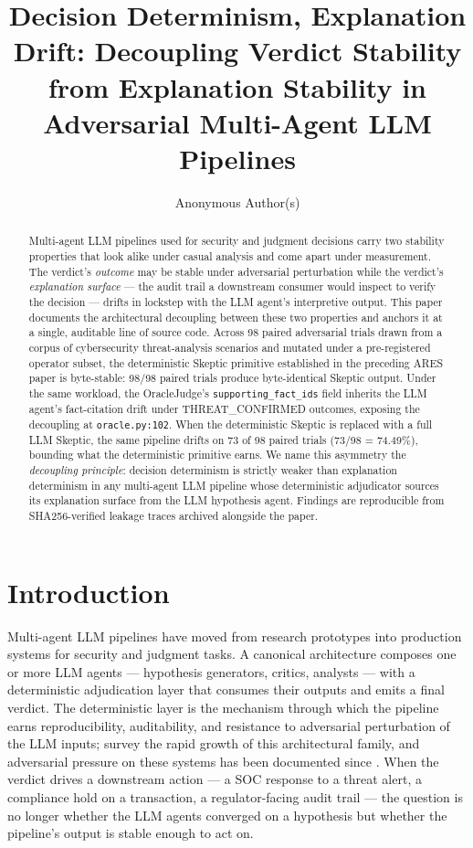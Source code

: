 \documentclass[sigconf,anonymous,review,nonacm=false]{acmart}
\title{Decision Determinism, Explanation Drift: Decoupling Verdict Stability from Explanation Stability in Adversarial Multi-Agent LLM Pipelines}
\author{Anonymous Author(s)}
\affiliation{%
  \institution{Submission under double-blind review}
  \country{}
}
\begin{document}
\begin{abstract}
Multi-agent LLM pipelines used for security and judgment decisions carry two stability properties that look alike under casual analysis and come apart under measurement. The verdict's \textit{outcome} may be stable under adversarial perturbation while the verdict's \textit{explanation surface} — the audit trail a downstream consumer would inspect to verify the decision — drifts in lockstep with the LLM agent's interpretive output. This paper documents the architectural decoupling between these two properties and anchors it at a single, auditable line of source code. Across 98 paired adversarial trials drawn from a corpus of cybersecurity threat-analysis scenarios and mutated under a pre-registered operator subset, the deterministic Skeptic primitive established in the preceding ARES paper \citep{gmys-casiano-2026} is byte-stable: 98/98 paired trials produce byte-identical Skeptic output. Under the same workload, the OracleJudge's \texttt{supporting\_fact\_ids} field inherits the LLM agent's fact-citation drift under THREAT\_CONFIRMED outcomes, exposing the decoupling at \texttt{oracle.py:102}. When the deterministic Skeptic is replaced with a full LLM Skeptic, the same pipeline drifts on 73 of 98 paired trials (73/98 = 74.49\%), bounding what the deterministic primitive earns. We name this asymmetry the \textit{decoupling principle}: decision determinism is strictly weaker than explanation determinism in any multi-agent LLM pipeline whose deterministic adjudicator sources its explanation surface from the LLM hypothesis agent. Findings are reproducible from SHA256-verified leakage traces archived alongside the paper.

\end{abstract}
\maketitle


\section{Introduction}
Multi-agent LLM pipelines have moved from research prototypes into production systems for security and judgment tasks. A canonical architecture composes one or more LLM agents — hypothesis generators, critics, analysts — with a deterministic adjudication layer that consumes their outputs and emits a final verdict. The deterministic layer is the mechanism through which the pipeline earns reproducibility, auditability, and resistance to adversarial perturbation of the LLM inputs; \citet{guo-2024} survey the rapid growth of this architectural family, and adversarial pressure on these systems has been documented since \citet{greshake-2023}. When the verdict drives a downstream action — a SOC response to a threat alert, a compliance hold on a transaction, a regulator-facing audit trail — the question is no longer whether the LLM agents converged on a hypothesis but whether the pipeline's output is stable enough to act on.
\end{document}
